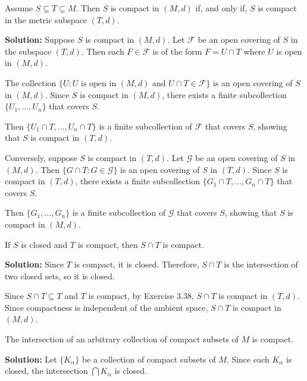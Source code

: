 \begin{problembox}
Assume \( S \subseteq T \subseteq M \). Then \( S \) is compact in \((M, d)\) if, and only if, \( S \) is compact in the metric subspace \((T, d)\).
\end{problembox}

\textbf{Solution:} Suppose $S$ is compact in $(M,d)$. Let $\mathcal{F}$ be an open covering of $S$ in the subspace $(T,d)$. Then each $F \in \mathcal{F}$ is of the form $F = U \cap T$ where $U$ is open in $(M,d)$.

The collection $\{U : U \text{ is open in } (M,d) \text{ and } U \cap T \in \mathcal{F}\}$ is an open covering of $S$ in $(M,d)$. Since $S$ is compact in $(M,d)$, there exists a finite subcollection $\{U_1, \ldots, U_n\}$ that covers $S$.

Then $\{U_1 \cap T, \ldots, U_n \cap T\}$ is a finite subcollection of $\mathcal{F}$ that covers $S$, showing that $S$ is compact in $(T,d)$.

Conversely, suppose $S$ is compact in $(T,d)$. Let $\mathcal{G}$ be an open covering of $S$ in $(M,d)$. Then $\{G \cap T : G \in \mathcal{G}\}$ is an open covering of $S$ in $(T,d)$. Since $S$ is compact in $(T,d)$, there exists a finite subcollection $\{G_1 \cap T, \ldots, G_n \cap T\}$ that covers $S$.

Then $\{G_1, \ldots, G_n\}$ is a finite subcollection of $\mathcal{G}$ that covers $S$, showing that $S$ is compact in $(M,d)$.

\begin{problembox}
If \( S \) is closed and \( T \) is compact, then \( S \cap T \) is compact.
\end{problembox}

\textbf{Solution:} Since $T$ is compact, it is closed. Therefore, $S \cap T$ is the intersection of two closed sets, so it is closed.

Since $S \cap T \subseteq T$ and $T$ is compact, by Exercise 3.38, $S \cap T$ is compact in $(T,d)$. Since compactness is independent of the ambient space, $S \cap T$ is compact in $(M,d)$.

\begin{problembox}
The intersection of an arbitrary collection of compact subsets of \( M \) is compact.
\end{problembox}

\textbf{Solution:} Let $\{K_\alpha\}$ be a collection of compact subsets of $M$. Since each $K_\alpha$ is closed, the intersection $\bigcap K_\alpha$ is closed.

